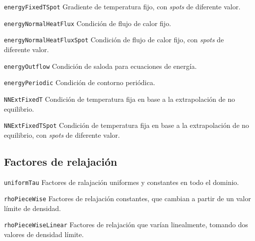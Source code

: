 \texttt{energyFixedTSpot}\: Gradiente de temperatura fijo, con \emph{spots} de diferente valor.
\medskip

\texttt{energyNormalHeatFlux}\: Condici\'on de flujo de calor fijo.
\medskip

\texttt{energyNormalHeatFluxSpot}\: Condici\'on de flujo de calor fijo, con \emph{spots} de diferente valor.
\medskip

\texttt{energyOutflow}\: Condici\'on de saloda para ecuaciones de energ\'ia.
\medskip

\texttt{energyPeriodic}\: Condici\'on de contorno peri\'odica.
\medskip

\texttt{NNExtFixedT}\: Condici\'on de temperatura fija en base a la extrapolaci\'on de no equilibrio.
\medskip

\texttt{NNExtFixedTSpot}\: Condici\'on de temperatura fija en base a la extrapolaci\'on de no equilibrio, con \emph{spots} de diferente valor.
\medskip



\subsection{Factores de relajaci\'on}

\texttt{uniformTau}\: Factores de ralajaci\'on uniformes y constantes en todo el dominio.
\medskip

\texttt{rhoPieceWise}\:  Factores de relajaci\'on constantes, que cambian a partir de un valor l\'imite de densidad.
\medskip

\texttt{rhoPieceWiseLinear}\: Factores de relajaci\'on que var\'ian linealmente, tomando dos valores de densidad l\'imite.

